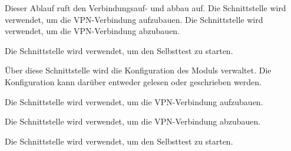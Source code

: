 

Dieser Ablauf ruft den Verbindungsauf- und abbau auf. Die Schnittstelle
 wird verwendet, um die VPN-Verbindung
aufzubauen. Die Schnittstelle  wird
verwendet, um die VPN-Verbindung abzubauen.



Die Schnittstelle  wird
verwendet, um den Selbsttest zu starten.





Über diese Schnittstelle wird die Konfiguration des Moduls
 verwaltet. Die Konfiguration kann darüber entweder
gelesen oder geschrieben werden.




Die Schnittstelle  wird
verwendet, um die VPN-Verbindung aufzubauen.


Die Schnittstelle  wird
verwendet, um die VPN-Verbindung abzubauen.


Die Schnittstelle  wird
verwendet, um den Selbsttest zu starten.

